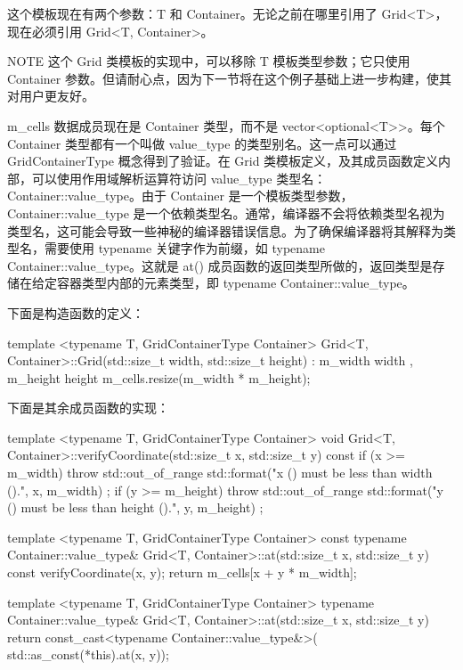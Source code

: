 这个模板现在有两个参数：T 和 Container。无论之前在哪里引用了 Grid<T>，现在必须引用 Grid<T, Container>。

\begin{myNotic}{NOTE}
这个 Grid 类模板的实现中，可以移除 T 模板类型参数；它只使用 Container 参数。但请耐心点，因为下一节将在这个例子基础上进一步构建，使其对用户更友好。
\end{myNotic}

m\_cells 数据成员现在是 Container 类型，而不是 vector<optional<T>{}>。每个 Container 类型都有一个叫做 value\_type 的类型别名。这一点可以通过 GridContainerType 概念得到了验证。在 Grid 类模板定义，及其成员函数定义内部，可以使用作用域解析运算符访问 value\_type 类型名：Container::value\_type。由于 Container 是一个模板类型参数，Container::value\_type 是一个依赖类型名。通常，编译器不会将依赖类型名视为类型名，这可能会导致一些神秘的编译器错误信息。为了确保编译器将其解释为类型名，需要使用 typename 关键字作为前缀，如 typename Container::value\_type。这就是 at() 成员函数的返回类型所做的，返回类型是存储在给定容器类型内部的元素类型，即 typename Container::value\_type。

下面是构造函数的定义：

\begin{cpp}
template <typename T, GridContainerType Container>
Grid<T, Container>::Grid(std::size_t width, std::size_t height)
    : m_width { width }, m_height { height }
{
    m_cells.resize(m_width * m_height);
}
\end{cpp}

下面是其余成员函数的实现：

\begin{cpp}
template <typename T, GridContainerType Container>
void Grid<T, Container>::verifyCoordinate(std::size_t x, std::size_t y) const
{
    if (x >= m_width) {
        throw std::out_of_range {
            std::format("x ({}) must be less than width ({}).", x, m_width) };
    }
    if (y >= m_height) {
        throw std::out_of_range {
            std::format("y ({}) must be less than height ({}).", y, m_height) };
    }
}

template <typename T, GridContainerType Container>
const typename Container::value_type&
    Grid<T, Container>::at(std::size_t x, std::size_t y) const
{
    verifyCoordinate(x, y);
    return m_cells[x + y * m_width];
}

template <typename T, GridContainerType Container>
typename Container::value_type&
    Grid<T, Container>::at(std::size_t x, std::size_t y)
{
    return const_cast<typename Container::value_type&>(
        std::as_const(*this).at(x, y));
}
\end{cpp}

